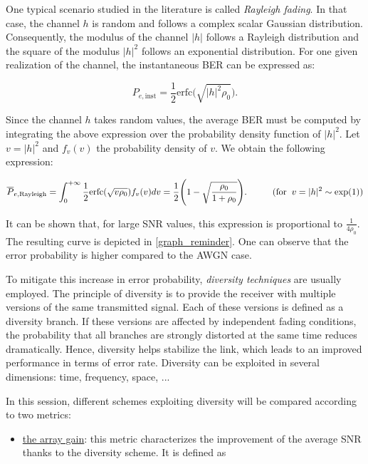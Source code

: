 \documentclass [a4paper, 11pt] {article}
\begin{document}
\begin{reminder}
    One typical scenario studied in the literature is called \textit{Rayleigh fading}. In that case, the channel $h$ is random and follows a complex scalar Gaussian distribution. Consequently, the modulus of the channel $|h|$ follows a Rayleigh distribution and the square of the modulus $|h|^2$ follows an exponential distribution. For one given realization of the channel, the instantaneous BER can be expressed as:
    
    \begin{equation}
        P_{e,\text{inst}}= \frac{1}{2}\text{erfc}\big(\sqrt{|h|^2 \rho_0}\big). 
    \end{equation}
    
    
    Since the channel $h$ takes random values, the average BER must be computed by integrating the above expression over the probability density function of $|h|^2$. Let $v = |h|^2$ and $f_v(v)$ the probability density of $v$. We obtain the following expression: 
    
    
    \begin{equation}
        \overline{P}_{e,\text{Rayleigh}}= \int^{+\infty}_{0}\frac{1}{2}\text{erfc}(\sqrt{v \rho_0}) f_v(v) dv = \frac{1}{2} \Bigg(1 - \sqrt{\frac{\rho_0}{1+\rho_0}}\Bigg). \hspace{1 cm} (\text{for} \; \; v = |h|^2 \sim \exp(1))
    \end{equation}
    
    It can be shown that, for large SNR values, this expression is proportional to $\frac{1}{4\rho_0}$. The resulting curve is depicted in \autoref{graph_reminder}. One can observe that the error probability is higher compared to the AWGN case. 
    
    
    To mitigate this increase in error probability, \textit{diversity techniques} are usually employed. The principle of diversity is to provide the receiver with multiple versions of the same transmitted signal. Each of these versions is defined as a diversity branch. If these versions are affected by independent fading conditions, the probability that all branches are strongly distorted at the same time reduces dramatically. Hence, diversity helps stabilize the link, which leads to an improved performance in terms of error rate. Diversity can be exploited in several dimensions: time, frequency, space, ...
    
    
    In this session, different schemes exploiting diversity will be compared according to two metrics: 
    
    \begin{itemize}
        \item \underline{the array gain}: this metric characterizes the improvement of the average SNR thanks to the diversity scheme. It is defined as 
        

\end{itemize}
\end{reminder}
\end{document}
